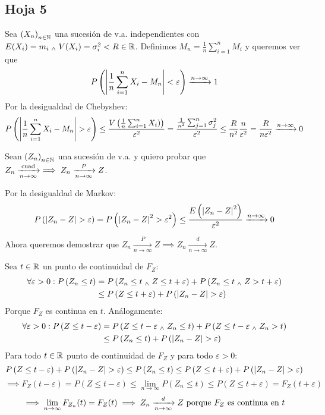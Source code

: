 \subsection{Hoja 5}

 Sea $\left(X_n\right)_{n\in\mathbb{N}}$ una sucesión de v.a. independientes con $E(X_i) = m_i \; _{\wedge} \; V(X_i) = \sigma_i^2 < R \in \mathbb{R}$. Definimos $M_n = \frac{1}{n} \sum_{i=1}^{n} M_i$ y queremos ver que
\[P\left(\left|\frac{1}{n} \sum_{i=1}^{n} X_i - M_n\right| < \varepsilon\right) \xrightarrow{n\to\infty} 1\]
Por la desigualdad de Chebyshev:
\[P\left(\left|\frac{1}{n} \sum_{i=1}^{n} X_i - M_n\right| > \varepsilon\right) \leq \frac{V\left(\frac{1}{n} \sum_{i=1}^{n} X_i)\right)}{\varepsilon^2} = \frac{\frac{1}{n^2} \sum_{j=1}^n \sigma_j^2}{\varepsilon^2} \leq \frac{R}{n^2}\frac{n}{\varepsilon^2} = \frac{R}{n\varepsilon^2} \xrightarrow{n\to\infty} 0\]

 Sean $\left(Z_n\right)_{n\in\mathbb{N}}$ una sucesión de v.a. y quiero probar que $Z_n \xrightarrow[n\to\infty]{\text{cuad}} \implies Z_n \xrightarrow[n\to\infty]{P} Z$.
\begin{dem} Por la desigualdad de Markov:
	\[P\left(\left|Z_n - Z\right| > \varepsilon\right) = P\left(\left|Z_n - Z\right|^2 > \varepsilon^2\right) \leq \frac{E\left(\left|Z_n - Z\right|^2\right)}{\varepsilon^2} \xrightarrow{n\to\infty} 0\]
\end{dem}
Ahora queremos demostrar que $Z_n \xrightarrow[n\to\infty]{P} Z \implies Z_n \xrightarrow[n\to\infty]{d} Z$.
\begin{dem} Sea $t\in\mathbb{R}$ un punto de continuidad de $F_Z$:
	\[\begin{aligned}
			\forall \varepsilon > 0 : P\left(Z_n \leq t\right) & = P\left(Z_n \leq t \; _{\wedge} \; Z \leq t+\varepsilon\right) + P\left(Z_n \leq t \; _{\wedge} \; Z > t+\varepsilon\right) \\
			                                                   & \leq P\left(Z \leq t+\varepsilon\right) + P\left(\left|Z_n - Z\right| > \varepsilon\right)
		\end{aligned}\]
	Porque $F_Z$ es continua en $t$. Análogamente:
	\[\begin{aligned}
			\forall \varepsilon > 0 : P\left(Z \leq t -\varepsilon\right) & = P\left(Z \leq t -\varepsilon \; _{\wedge} \; Z_n \leq t\right) + P\left(Z \leq t -\varepsilon \; _{\wedge} \; Z_n > t\right) \\
			                                                              & \leq P\left(Z_n \leq t\right) + P\left(\left|Z_n - Z\right| > \varepsilon\right)
		\end{aligned}\]
	Para todo $t\in\mathbb{R}$ punto de continuidad de $F_Z$ y para todo $\varepsilon > 0$:
	\[P\left(Z \leq t - \varepsilon\right) + P\left(\left|Z_n - Z\right| > \varepsilon\right) \leq P\left(Z_n \leq t\right) \leq P\left(Z \leq t + \varepsilon\right) + P\left(\left|Z_n - Z\right| > \varepsilon\right)\]
	\[\implies F_Z(t-\varepsilon) = P\left(Z \leq t - \varepsilon\right) \leq \lim_{n\to\infty} P\left(Z_n \leq t\right) \leq P\left(Z \leq t + \varepsilon\right) = F_Z(t+\varepsilon)\]
	\[\implies \lim_{n\to\infty} F_{Z_n}(t) = F_Z(t) \implies Z_n \xrightarrow[n\to\infty]{d} Z\text{ porque } F_Z \text{ es continua en } t\]
\end{dem}

